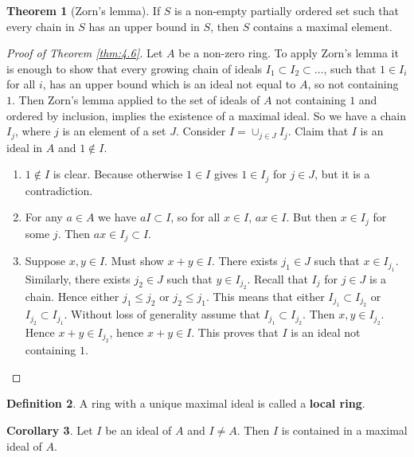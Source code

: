\documentclass{article}
\theoremstyle{definition}\newtheorem{definition}{Definition}[section]
\theoremstyle{definition}\newtheorem{remark}[definition]{Remark}
\theoremstyle{definition}\newtheorem*{example}{Example}
\theoremstyle{definition}\newtheorem*{note}{Note}
\newtheorem{theorem}[definition]{Theorem}
\newtheorem{corollary}[definition]{Corollary}
\begin{document}
\begin{theorem}[Zorn's lemma]
If $ S $ is a non-empty partially ordered set such that every chain in $ S $ has an upper bound in $ S $, then $ S $ contains a maximal element.
\end{theorem}

\begin{proof}[Proof of Theorem \ref{thm:4.6}]
Let $ A $ be a non-zero ring. To apply Zorn's lemma it is enough to show that every growing chain of ideals $ I_1 \subset I_2 \subset \dots $, such that $ 1 \in I_i $ for all $ i $, has an upper bound which is an ideal not equal to $ A $, so not containing $ 1 $. Then Zorn's lemma applied to the set of ideals of $ A $ not containing $ 1 $ and ordered by inclusion, implies the existence of a maximal ideal. So we have a chain $ I_j $, where $ j $ is an element of a set $ J $. Consider $ I = \cup_{j \in J} I_j $. Claim that $ I $ is an ideal in $ A $ and $ 1 \notin I $.
\begin{enumerate}
\item $ 1 \notin I $ is clear. Because otherwise $ 1 \in I $ gives $ 1 \in I_j $ for $ j \in J $, but it is a contradiction.
\item For any $ a \in A $ we have $ aI \subset I $, so for all $ x \in I $, $ ax \in I $. But then $ x \in I_j $ for some $ j $. Then $ ax \in I_j \subset I $.
\item Suppose $ x, y \in I $. Must show $ x + y \in I $. There exists $ j_1 \in J $ such that $ x \in I_{j_1} $. Similarly, there exists $ j_2 \in J $ such that $ y \in I_{j_2} $. Recall that $ I_j $ for $ j \in J $ is a chain. Hence either $ j_1 \le j_2 $ or $ j_2 \le j_1 $. This means that either $ I_{j_1} \subset I_{j_2} $ or $ I_{j_2} \subset I_{j_1} $. Without loss of generality assume that $ I_{j_1} \subset I_{j_2} $. Then $ x, y \in I_{j_2} $. Hence $ x + y \in I_{j_2} $, hence $ x + y \in I $. This proves that $ I $ is an ideal not containing $ 1 $.
\end{enumerate}
\end{proof}

\begin{definition}
A ring with a unique maximal ideal is called a \textbf{local ring}.
\end{definition}

\begin{corollary}
\label{cor:4.9}
Let $ I $ be an ideal of $ A $ and $ I \ne A $. Then $ I $ is contained in a maximal ideal of $ A $.
\end{corollary}
\end{document}
